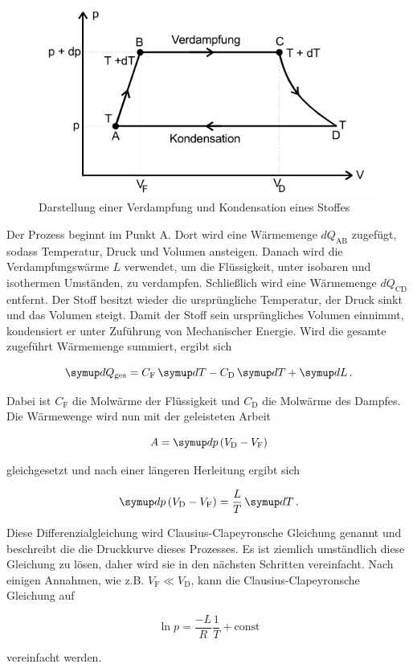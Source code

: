 \begin{figure}
    \centering
    \includegraphics[width=\textwidth/2]{images/bild2.png}
    \caption{Darstellung einer Verdampfung und Kondensation eines Stoffes \cite{V203}}
    \label{fig:skizze_2}
\end{figure}

Der Prozess beginnt im Punkt A.
Dort wird eine Wärmemenge $dQ_\text{AB}$ zugefügt, sodass Temperatur, Druck und Volumen ansteigen.
Danach wird die Verdampfungswärme $L$ verwendet, um die Flüssigkeit, unter isobaren und isothermen Umständen, zu verdampfen.
Schließlich wird eine Wärmemenge $dQ_\text{CD}$ entfernt.
Der Stoff besitzt wieder die ursprüngliche Temperatur, der Druck sinkt und das Volumen steigt.
Damit der Stoff sein ursprüngliches Volumen einnimmt, kondensiert er unter Zuführung von Mechanischer Energie.
Wird die gesamte zugeführt Wärmemenge summiert, ergibt sich

\begin{equation}
    \dif{Q_\text{ges}} = C_\text{F} \dif{T} - C_\text{D} \dif{T} + \dif{L}.
    \label{eq:waerme}
\end{equation}

Dabei ist $C_\text{F}$ die Molwärme der Flüssigkeit und $C_\text{D}$ die Molwärme des Dampfes.
Die Wärmewenge wird nun mit der geleisteten Arbeit

\begin{equation}
    A = \dif{p} \left(V_\text{D} - V_\text{F}\right)
    \label{eq:arbeit}
\end{equation}

gleichgesetzt und nach einer längeren Herleitung ergibt sich

\begin{equation}
    \dif{p} \left(V_\text{D} - V_\text{F}\right) = \frac{L}{T} \dif{T}.
    \label{eq:clapeyron}
\end{equation}

Diese Differenzialgleichung wird Clausius-Clapeyronsche Gleichung genannt und beschreibt die die Druckkurve dieses Prozesses.
Es ist ziemlich umständlich diese Gleichung zu lösen, daher wird sie in den nächsten Schritten vereinfacht.
Nach einigen Annahmen, wie z.B. $V_\text{F} \ll V_\text{D}$, kann die Clausius-Clapeyronsche Gleichung auf

\begin{equation}
    \ln p = \frac{-L}{R} \frac{1}{T} + \text{const}
    \label{eq:druck}
\end{equation}

vereinfacht werden.